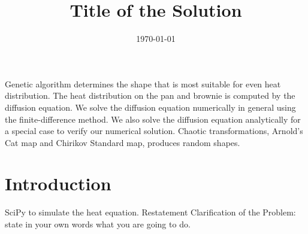 \documentclass[12pt]{reedmcm}
\title{\textbf{Title of the Solution}}
\date{\today}
\begin{document}

\begin{summary}
  Genetic algorithm determines the shape that is most suitable for even heat distribution.
  The heat distribution on the pan and brownie is computed by the diffusion equation.
  We solve the diffusion equation numerically in general using the finite-difference method.
  We also solve the diffusion equation analytically for a special case to verify our numerical solution.
  Chaotic transformations, Arnold's Cat map and Chirikov Standard map, produces random shapes.


  \end{summary}

\maketitle
\tableofcontents
\listoffigures

\section{Introduction}
SciPy to simulate the heat equation.
Restatement Clarification of the Problem: state in your own words what you are going to do.
\end{document}
